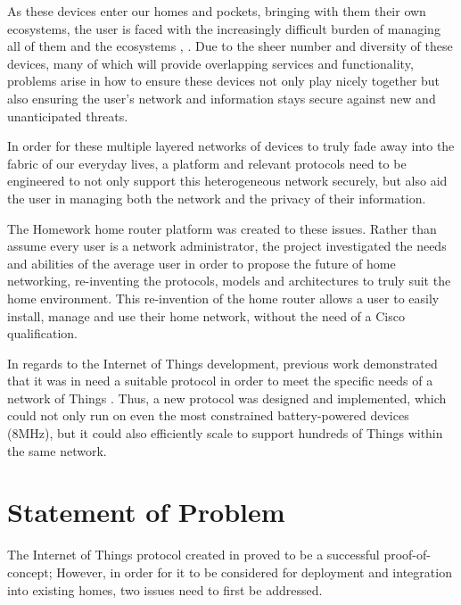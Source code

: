 \documentclass{mprop}
\begin{document}
As these devices enter our homes and pockets, bringing with them their own ecosystems, the user is faced with the increasingly difficult burden of managing all of them and the ecosystems \cite{brundell2011w}, \cite{brown2013multinet}. Due to the sheer number and diversity of these devices, many of which will provide overlapping services and functionality, problems arise in how to ensure these devices not only play nicely together but also ensuring the user's network and information stays secure against new and unanticipated threats.

In order for these multiple layered networks of devices to truly fade away into the fabric of our everyday lives, a platform and relevant protocols need to be engineered to not only support this heterogeneous network securely, but also aid the user in managing both the network and the privacy of their information.

The Homework home router platform was created to these issues. Rather than assume every user is a network administrator, the project investigated the needs and abilities of the average user in order to propose the future of home networking, re-inventing the protocols, models and architectures to truly suit the home environment. This re-invention of the home router allows a user to easily install, manage and use their home network, without the need of a Cisco qualification.

In regards to the Internet of Things development, previous work demonstrated that it was in need a suitable protocol in order to meet the specific needs of a network of Things \cite{KNoT}. Thus, a new protocol was designed and implemented, which could not only run on even the most constrained battery-powered devices (8MHz), but it could also efficiently scale to support hundreds of Things within the same network.




\section{Statement of Problem}

The Internet of Things protocol created in \cite{KNoT} proved to be a successful proof-of-concept; However, in order for it to be considered for deployment and integration into existing homes, two issues need to first be addressed.
\end{document}
